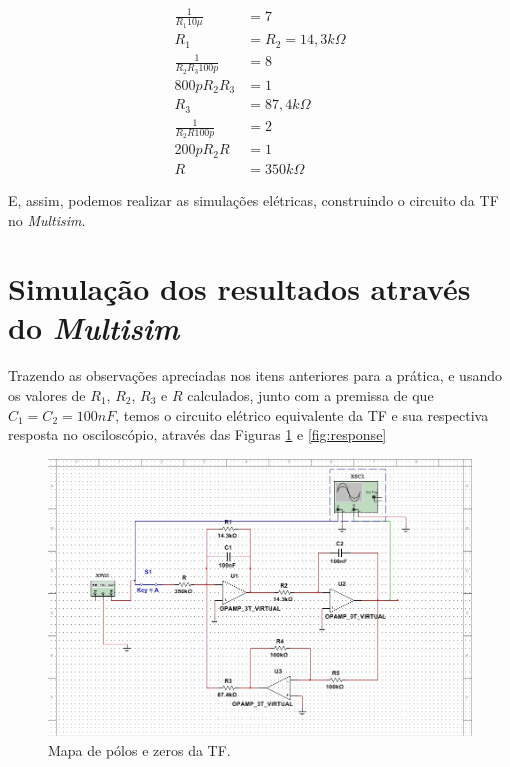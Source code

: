 \documentclass[
	article,			%
	11pt,				%
	oneside,			%
	a4paper,			%
	english,			%
	brazil,				%
	sumario=tradicional
	]{abntex2}
\begin{document}
\begin{align*}
  \frac{1}{R_1 10\mu} &= 7 \\
  R_1 &= R_2 = 14,3k\Omega \\
  \frac{1}{R_2R_3 100p} &= 8 \\
  800p R_2R_3 &= 1 \\
  R_3 &= 87,4k\Omega \\
  \frac{1}{R_2R 100p} &= 2 \\
  200p R_2R &= 1 \\
  R &= 350k\Omega
\end{align*}

E, assim, podemos realizar as simulações elétricas, construindo o circuito da TF no \emph{Multisim}.

\section{Simulação dos resultados através do \emph{Multisim}}

Trazendo as observações apreciadas nos itens anteriores para a prática, e usando os valores de ${R_1}$, ${R_2}$, ${R_3}$ e ${R}$ calculados, junto com a premissa de que ${C_1 = C_2 = 100nF}$, temos o circuito elétrico equivalente da TF e sua respectiva resposta no osciloscópio, através das Figuras \ref{fig:circuit} e \ref{fig:response}

\begin{figure}[h!]
  \includegraphics[width=\linewidth, center]{multisim_circuit.jpg}
  \caption{Mapa de pólos e zeros da TF.}
  \label{fig:circuit}
\end{figure}
\end{document}
